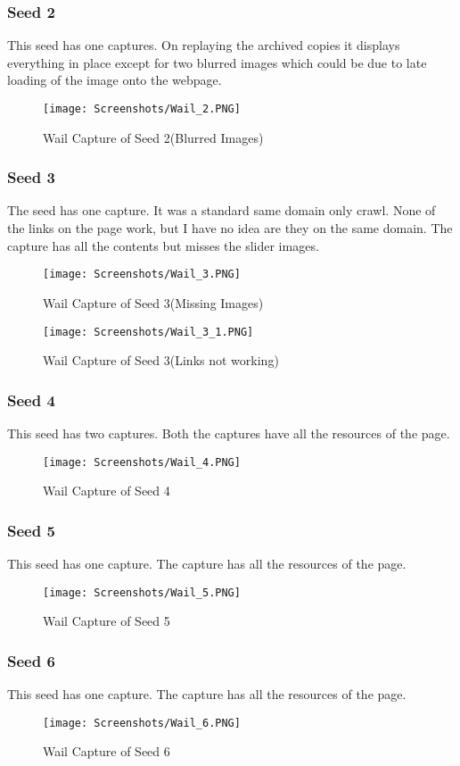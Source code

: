 \documentclass[11pt,journal,compsoc,onecolumn]{IEEEtran}
\begin{document}
\subsubsection{Seed 2}
This seed has one captures. On replaying the archived copies it displays everything in place except for two blurred images which could be due to late loading of the image onto the webpage.
 \begin{figure}[ht] 
  \centering
  \texttt{[image: Screenshots/Wail\_2.PNG]}
  \caption{Wail Capture of Seed 2(Blurred Images)}
  \label{fig:41}
\end{figure}
\subsubsection{Seed 3}
The seed has one capture. It was a standard same domain only crawl. None of the links on the page work, but I have no idea are they on the same domain. The capture has all the contents but misses the slider images.
 \begin{figure}[ht] 
  \centering
  \texttt{[image: Screenshots/Wail\_3.PNG]}
  \caption{Wail Capture of Seed 3(Missing Images)}
  \label{fig:42}
\end{figure}
 \begin{figure}[ht] 
  \centering
  \texttt{[image: Screenshots/Wail\_3\_1.PNG]}
  \caption{Wail Capture of Seed 3(Links not working)}
  \label{fig:43}
\end{figure}
\subsubsection{Seed 4}
This seed has two captures. Both the captures have all the resources of the page.  
 \begin{figure}[ht] 
  \centering
  \texttt{[image: Screenshots/Wail\_4.PNG]}
  \caption{Wail Capture of Seed 4}
  \label{fig:43}
\end{figure}
\subsubsection{Seed 5}
This seed has one capture. The capture has all the resources of the page.  
 \begin{figure}[ht] 
  \centering
  \texttt{[image: Screenshots/Wail\_5.PNG]}
  \caption{Wail Capture of Seed 5}
  \label{fig:44}
\end{figure}
\subsubsection{Seed 6}
This seed has one capture. The capture has all the resources of the page.  
 \begin{figure}[ht] 
  \centering
  \texttt{[image: Screenshots/Wail\_6.PNG]}
  \caption{Wail Capture of Seed 6}
  \label{fig:45}
\end{figure}
\end{document}
